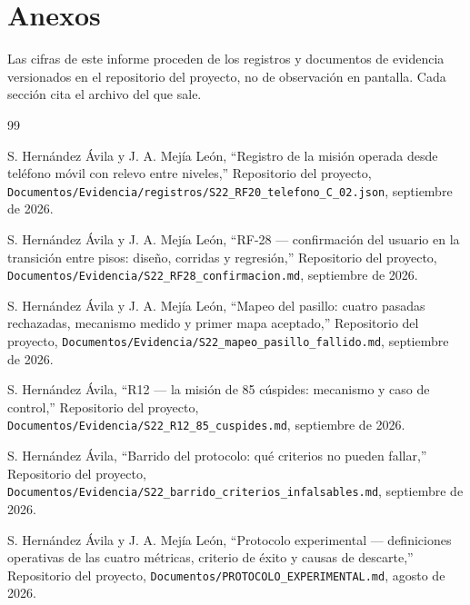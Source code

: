 \documentclass[12pt,letterpaper]{article}
\begin{document}
\section{Anexos}

Las cifras de este informe proceden de los registros y documentos de evidencia versionados en el repositorio del proyecto, no de observación en pantalla. Cada sección cita el archivo del que sale.

\begin{thebibliography}{99}

S. Hernández Ávila y J. A. Mejía León,
``Registro de la misión operada desde teléfono móvil con relevo entre niveles,''
Repositorio del proyecto, \texttt{Documentos/Evidencia/registros/S22\_RF20\_telefono\_C\_02.json}, septiembre de 2026.

S. Hernández Ávila y J. A. Mejía León,
``RF-28 --- confirmación del usuario en la transición entre pisos: diseño, corridas y regresión,''
Repositorio del proyecto, \texttt{Documentos/Evidencia/S22\_RF28\_confirmacion.md}, septiembre de 2026.

S. Hernández Ávila y J. A. Mejía León,
``Mapeo del pasillo: cuatro pasadas rechazadas, mecanismo medido y primer mapa aceptado,''
Repositorio del proyecto, \texttt{Documentos/Evidencia/S22\_mapeo\_pasillo\_fallido.md}, septiembre de 2026.

S. Hernández Ávila,
``R12 --- la misión de 85 cúspides: mecanismo y caso de control,''
Repositorio del proyecto, \texttt{Documentos/Evidencia/S22\_R12\_85\_cuspides.md}, septiembre de 2026.

S. Hernández Ávila,
``Barrido del protocolo: qué criterios no pueden fallar,''
Repositorio del proyecto, \texttt{Documentos/Evidencia/S22\_barrido\_criterios\_infalsables.md}, septiembre de 2026.

S. Hernández Ávila y J. A. Mejía León,
``Protocolo experimental --- definiciones operativas de las cuatro métricas, criterio de éxito y causas de descarte,''
Repositorio del proyecto, \texttt{Documentos/PROTOCOLO\_EXPERIMENTAL.md}, agosto de 2026.

\end{thebibliography}
\end{document}
